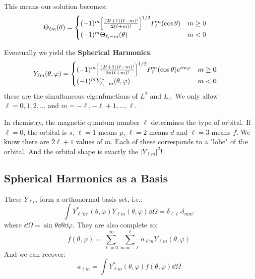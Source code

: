 This means our solution becomes:
\begin{align*}
    \Theta_{\ell m}(\theta) &= \begin{cases}
        (-1)^m \qty[\frac{(2 \ell + 1)(\ell - m)!}{2(\ell + m)!}]^{1/2} P_{\ell}^m(\cos \theta) & m \geq 0 \\
        (-1)^m \Theta_{\ell, -m}(\theta) & m < 0
    \end{cases}
\end{align*}

Eventually we yield the \textbf{Spherical Harmonics}.
\begin{align*}
    Y_{\ell m}(\theta, \varphi) &= \begin{cases}
        (-1)^m \qty[\frac{(2 \ell + 1)(\ell - m)!}{4 \pi (\ell + m)!}]^{1/2} P_{\ell}^m (\cos \theta) e^{i m \varphi} & m \geq 0 \\
        (-1)^m Y_{\ell, -m}^*(\theta, \varphi) & m < 0
    \end{cases}
\end{align*}
these are the simultaneous eigenfunctions of $L^2$ and $L_z$. We only allow $\ell = 0, 1, 2, \dots$ and $m = - \ell , -\ell + 1, \dots, \ell$.

In chemistry, the magnetic quantum number $\ell$ determines the type of orbital.
If $\ell = 0$, the orbital is $s$, $\ell =1$ means $p$, $\ell = 2$ means $d$ and $\ell = 3$ means $f$. We know there
are $2\ell + 1$ values of $m$. Each of these corresponds to a "lobe" of the orbital. And the orbital shape is exactly the $|Y_{\ell m}|^2$!

\subsection{Spherical Harmonics as a Basis}
These $Y_{\ell m}$ form a orthonormal basis set, i.e.:
\[ \int Y^*_{\ell' m'} (\theta, \varphi) Y_{\ell m}(\theta, \varphi) \dd{\Omega} = \delta_{\ell \ell'} \delta_{m m'} \]
where $\dd{\Omega} = \sin\theta\dd{\theta}\dd{\varphi}$. They are also complete so:
\[ f(\theta, \varphi) = \sum_{\ell = 0}^{\infty} \sum_{m = -\ell}^{\ell} a_{\ell m} Y_{\ell m}(\theta, \varphi) \]
And we can recover:
\[ a_{\ell m} = \int Y^*_{\ell m} (\theta, \varphi) f(\theta, \varphi) \dd{\Omega} \]